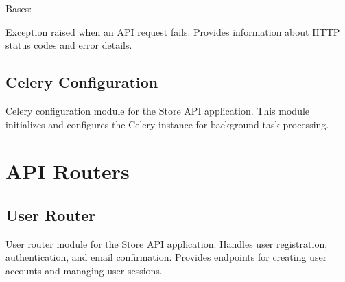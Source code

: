 \documentclass[letterpaper,10pt,openany,oneside,english]{sphinxmanual}
\begin{document}
\begin{savenotes}\begin{fulllineitems}
\label{\detokenize{modules/tasks:storeapi.tasks.APIResponseError}}
\pysigstartsignatures
{}
\pysigstopsignatures
\sphinxAtStartPar
Bases: 

\sphinxAtStartPar
Exception raised when an API request fails.
Provides information about HTTP status codes and error details.

\end{fulllineitems}\end{savenotes}



\section{Celery Configuration}
\label{\detokenize{modules/tasks:module-storeapi.celery_app}}\label{\detokenize{modules/tasks:celery-configuration}}
\sphinxAtStartPar
Celery configuration module for the Store API application.
This module initializes and configures the Celery instance for background task processing.

\sphinxstepscope


\chapter{API Routers}
\label{\detokenize{modules/routers:api-routers}}\label{\detokenize{modules/routers::doc}}

\section{User Router}
\label{\detokenize{modules/routers:module-storeapi.routers.user}}\label{\detokenize{modules/routers:user-router}}
\sphinxAtStartPar
User router module for the Store API application.
Handles user registration, authentication, and email confirmation.
Provides endpoints for creating user accounts and managing user sessions.
\end{document}
